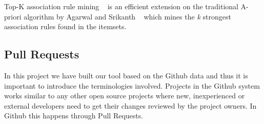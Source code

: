 \begin{table}[htbp]
  \centering
  \caption{}
  \hspace{1cm}
\end{table}


Top-K association rule mining ~\cite{fournier2012mining} is an efficient extension on the traditional A-priori algorithm by Agarwal and Srikanth ~\cite{Agrawal} which mines the \textit{k} strongest association rules found in the itemsets.


\subsection{Pull Requests}

In this project we have built our tool based on the Github data and thus it is important to introduce the terminologies involved. Projects in the Github system works similar to any other open source projects where new, inexperienced or external developers need to get their changes reviewed by the project owners. In Github this happens through Pull Requests.\\

